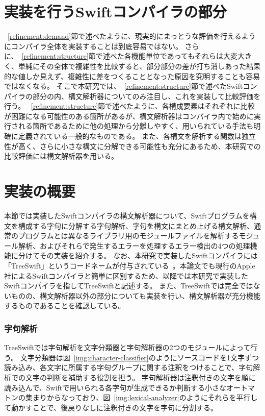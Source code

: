 \section{実装を行うSwiftコンパイラの部分}
\label{implementation:part}

~\ref{refinement:demand}節で述べたように、現実的にまっとうな評価を行えるようにコンパイラ全体を実装することは到底容易ではない。
さらに、~\ref{refinement:structure}節で述べた各機能単位であってもそれらは大変大きく、単純にその全体で複雑性を比較すると、部分部分の差が打ち消しあった結果的な値しか見えず、複雑性に差をつくることとなった原因を究明することも容易ではなくなる。
そこで本研究では、~\ref{refinement:structure}節で述べたSwiftコンパイラの部分の内、構文解析器についてのみ注目し、これを実装して比較評価を行う。
~\ref{refinement:structure}節で述べたように、各構成要素はそれぞれに比較が困難になる可能性のある箇所があるが、構文解析器はコンパイラ内で始めに実行される箇所であるために他の処理から分離しやすく、用いられている手法も明確に定義されている一般的なものである。
また、各構文を解析する関数は独立性が高く、さらに小さな構文に分解できる可能性も充分にあるため、本研究での比較評価には構文解析器を用いる。

\section{実装の概要}
\label{implementation:abstract}

本節では実装したSwiftコンパイラの構文解析器について、Swiftプログラムを構文を構成する字句に分解する字句解析、字句を構文にまとめ上げる構文解析、通常のプログラムとは異なるライブラリ用のモジュールファイルを解析するモジュール解析、およびそれらで発生するエラーを処理するエラー検出の4つの処理機能に分けてその実装を紹介する。
なお、本研究で実装したSwiftコンパイラには「TreeSwift」というコードネームが付与されている~\cite{treeswift}。本論文でも現行のApple社によるSwiftコンパイラと簡単に区別するため、以降では本研究で実装したSwiftコンパイラを指してTreeSwiftと記述する。
また、TreeSwiftでは完全ではないものの、構文解析器以外の部分についても実装を行い、構文解析器が充分機能するものであることを確認している。

\subsubsection{字句解析}

TreeSwiftでは字句解析を文字分類器と字句解析器の2つのモジュールによって行う。
文字分類器は図~\ref{img:character-classifier}のようにソースコードを1文字ずつ読み込み、各文字に所属する字句グループに関する注釈をつけることで、字句解析での文字の判断を補助する役割を担う。
字句解析器は注釈付きの文字を順に読み込んで、Swiftで用いられる各字句が生成できるか判断する小さなオートマトンの集まりからなっており、図~\ref{img:lexical-analyzer}のようにそれらを平行して動かすことで、後戻りなしに注釈付きの文字を字句に分割する。

